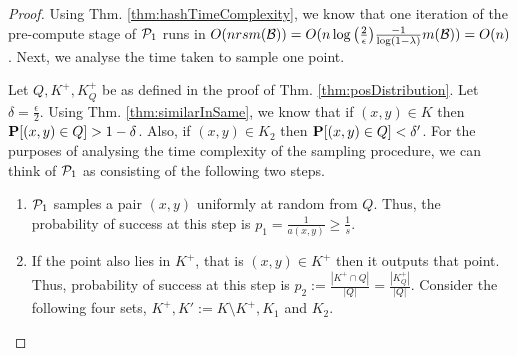\posRuntime*
\begin{proof}
Using Thm. \ref{thm:hashTimeComplexity}, we know that one iteration of the pre-compute stage of $\mathcal P_1$ runs in $O(n r s m(\mathcal B)) = O(n\log \big(\frac{2}{\epsilon}\big)\frac{-1}{\log(1-\lambda)} m(\mathcal B)) = O(n)$. Next, we analyse the time taken to sample one point.  

Let $Q, K^+, K_Q^+$ be as defined in the proof of Thm. \ref{thm:posDistribution}. Let $\delta = \frac{\epsilon}{2}$. Using Thm. \ref{thm:similarInSame}, we know that if $(x, y) \in K$ then $\mathbf P[(x, y) \in Q] > 1-\delta$. Also, if $(x, y) \in K_2$ then $\mathbf P[(x, y) \in Q] < \delta'$. For the purposes of analysing the time complexity of the sampling procedure, we can think of $\mathcal P_1$ as consisting of the following two steps. 
\begin{enumerate}[label=\textbf{T.\arabic*}]
  \item $\mathcal P_1$ samples a pair $(x, y)$ uniformly at random from $Q$. Thus, the probability of success at this step is $p_1 = \frac{1}{a(x, y)} \ge \frac{1}{s}$. 
  \item If the point also lies in $K^+$, that is $(x, y) \in K^+$ then it outputs that point. Thus, probability of success at this step is $p_2 := \frac{|K^+ \cap Q|}{|Q|} = \frac{|K^+_Q|}{|Q|}$. Consider the following four sets, $K^+, K' := K\setminus K^+, K_1$ and $K_2$. 


\end{enumerate}
\end{proof}
